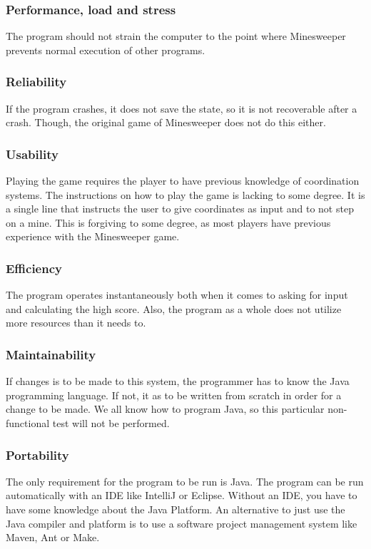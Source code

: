 \documentclass[UKenglish]{article}  %
\begin{document}
\subsubsection{Performance, load and stress} The program should not strain the
computer to the point where Minesweeper prevents normal execution of other
programs.

\subsubsection{Reliability} If the program crashes, it does not save the state,
so it is not recoverable after a crash. Though, the original game of Minesweeper
does not do this either.

\subsubsection{Usability} Playing the game requires the player to have previous
knowledge of coordination systems. The instructions on how to play the game is
lacking to some degree. It is a single line that instructs the user to give
coordinates as input and to not step on a mine. This is forgiving to some
degree, as most players have previous experience with the Minesweeper game.

\subsubsection{Efficiency} The program operates instantaneously both when it
comes to asking for input and calculating the high score. Also, the program as a
whole does not utilize more resources than it needs to.

\subsubsection{Maintainability} If changes is to be made to this system, the
programmer has to know the Java programming language. If not, it as to be
written from scratch in order for a change to be made. We all know how to
program Java, so this particular non-functional test will not be performed.

\subsubsection{Portability} The only requirement for the program to be run is
Java. The program can be run automatically with an IDE like IntelliJ or Eclipse.
Without an IDE, you have to have some knowledge about the Java Platform. An
alternative to just use the Java compiler and platform is to use a software
project management system like Maven, Ant or Make.
\end{document}
